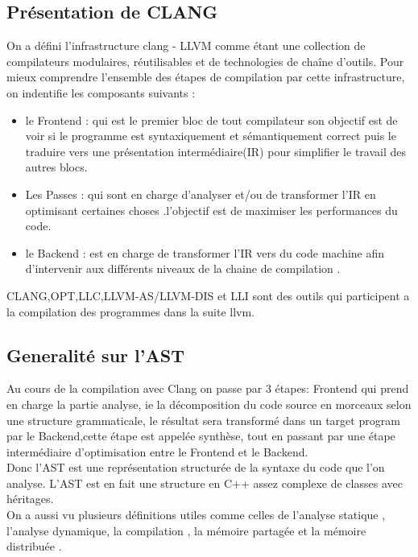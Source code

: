 \documentclass[12pt,a4paper]{article}
\begin{document}
\subsection{Présentation de CLANG \cite{clangllvm}  }

On a défini l'infrastructure clang - LLVM  comme étant une collection de compilateurs modulaires, réutilisables et de technologies de chaîne d’outils. Pour mieux comprendre l’ensemble des étapes de compilation par cette infrastructure, on indentifie les composants suivants :
    \begin{itemize}

    \item le Frontend : qui est le premier bloc de tout compilateur son objectif est de voir si le programme est syntaxiquement et sémantiquement correct puis le traduire vers une présentation intermédiaire(IR) pour simplifier le travail des autres blocs.
    \item Les Passes : qui sont en charge d'analyser et/ou de transformer l'IR en optimisant certaines choses .l'objectif est de maximiser les performances du code.
    \item le Backend : est en charge de transformer l'IR vers du code machine afin d'intervenir aux différents niveaux de la chaine de compilation .
     \end{itemize}
 CLANG,OPT,LLC,LLVM-AS/LLVM-DIS et LLI sont des outils qui participent a la compilation des programmes dans la suite llvm.


\subsection{Generalité sur l'AST}

Au cours de la compilation avec Clang on passe par 3 étapes: Frontend qui prend en charge la partie analyse, ie la décomposition du code source en morceaux selon une structure grammaticale, le résultat sera transformé  dans un target program par le Backend,cette étape est appelée synthèse, tout en passant par une étape intermédiaire d'optimisation entre le Frontend et le Backend.\cite{Devlieghere}\\ Donc l’AST est une représentation structurée de la syntaxe du code que l’on analyse. L’AST est en fait une structure en C++ assez complexe de classes avec héritages.\\


On a aussi vu plusieurs définitions utiles comme celles de l'analyse statique , l'analyse dynamique, la compilation , la mémoire partagée et la mémoire distribuée .
\end{document}
